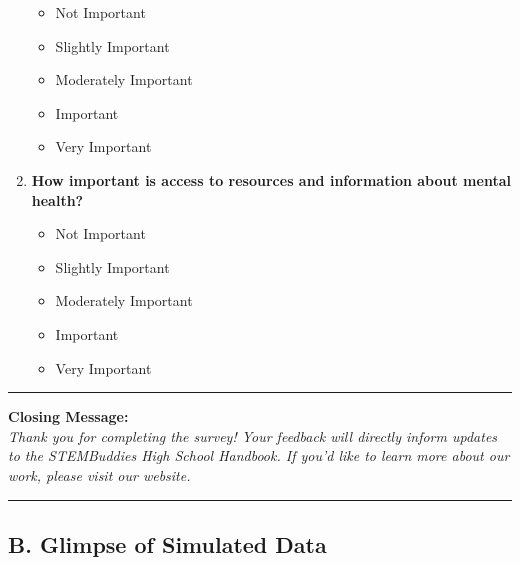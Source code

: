 \documentclass[
  letterpaper,
  DIV=11,
  numbers=noendperiod]{scrartcl}
\providecommand{\tightlist}{%
  \setlength{\itemsep}{0pt}\setlength{\parskip}{0pt}}\usepackage{longtable,booktabs,array}
\begin{document}
\begin{enumerate}
  \begin{itemize}
  \tightlist
  \item
    Not Important\\
  \item
    Slightly Important\\
  \item
    Moderately Important\\
  \item
    Important\\
  \item
    Very Important
  \end{itemize}
\item
  \textbf{How important is access to resources and information about
  mental health?}

  \begin{itemize}
  \tightlist
  \item
    Not Important\\
  \item
    Slightly Important\\
  \item
    Moderately Important\\
  \item
    Important\\
  \item
    Very Important
  \end{itemize}
\end{enumerate}

\begin{center}\rule{0.5\linewidth}{0.5pt}\end{center}

\textbf{Closing Message:}\\
\emph{Thank you for completing the survey! Your feedback will directly
inform updates to the STEMBuddies High School Handbook. If you'd like to
learn more about our work, please visit our website.}

\begin{center}\rule{0.5\linewidth}{0.5pt}\end{center}

\subsection{B. Glimpse of Simulated
Data}\label{b.-glimpse-of-simulated-data}
\end{document}
